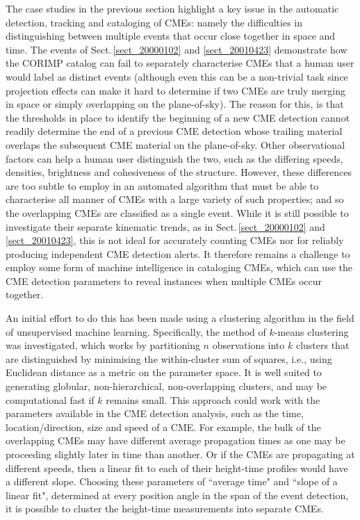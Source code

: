 \documentclass[referee,a4paper,12pt,traditabstract]{swsc}
\begin{document}
\begin{linenumbers}
The case studies in the previous section highlight a key issue in the automatic detection, tracking and cataloging of CMEs: namely the difficulties in distinguishing between multiple events that occur close together in space and time. The events of Sect.\,\ref{sect_20000102} and \ref{sect_20010423} demonstrate how the CORIMP catalog can fail to separately characterise CMEs that a human user would label as distinct events (although even this can be a non-trivial task since projection effects can make it hard to determine if two CMEs are truly merging in space or simply overlapping on the plane-of-sky). The reason for this, is that the thresholds in place to identify the beginning of a new CME detection cannot readily determine the end of a previous CME detection whose trailing material overlaps the subsequent CME material on the plane-of-sky. Other observational factors can help a human user distinguish the two, such as the differing speeds, densities, brightness and cohesiveness of the structure. However, these differences are too subtle to employ in an automated algorithm that must be able to characterise all manner of CMEs with a large variety of such properties; and so the overlapping CMEs are classified as a single event. While it is still possible to investigate their separate kinematic trends, as in Sect.\,\ref{sect_20000102} and \ref{sect_20010423}, this is not ideal for accurately counting CMEs nor for reliably producing independent CME detection alerts. It therefore remains a challenge to employ some form of machine intelligence in cataloging CMEs, which can use the CME detection parameters to reveal instances when multiple CMEs occur together.

An initial effort to do this has been made using a clustering algorithm in the field of unsupervised machine learning. Specifically, the method of $k$-means clustering was investigated, which works by partitioning $n$ observations into $k$ clusters that are distinguished by minimising the within-cluster sum of squares, i.e., using Euclidean distance as a metric on the parameter space. It is well suited to generating globular, non-hierarchical, non-overlapping clusters, and may be computational fast if $k$ remains small. This approach could work with the parameters available in the CME detection analysis, such as the time, location/direction, size and speed of a CME. For example, the bulk of the overlapping CMEs may have different average propagation times as one may be proceeding slightly later in time than another. Or if the CMEs are propagating at different speeds, then a linear fit to each of their height-time profiles would have a different slope. Choosing these parameters of ``average time" and ``slope of a linear fit", determined at every position angle in the span of the event detection, it is possible to cluster the height-time measurements into separate CMEs.


\end{linenumbers}
\end{document}
